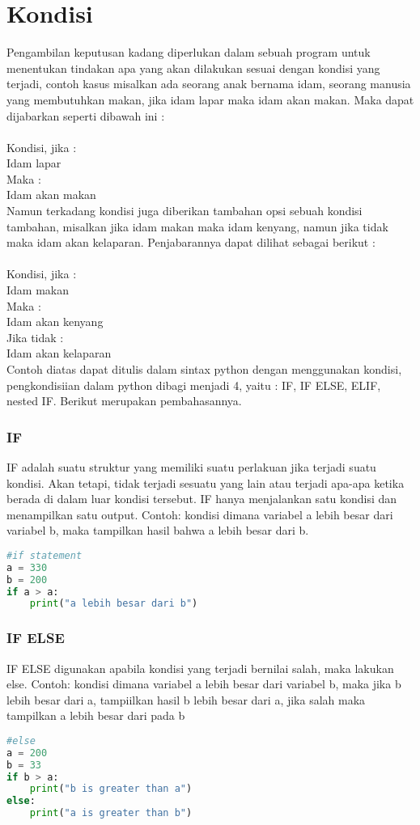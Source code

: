 \section{Kondisi}
Pengambilan keputusan kadang diperlukan dalam sebuah program untuk menentukan tindakan apa yang akan dilakukan sesuai dengan kondisi yang terjadi, contoh kasus misalkan ada seorang anak bernama idam, seorang manusia yang membutuhkan makan, jika idam lapar maka idam akan makan. Maka dapat dijabarkan seperti dibawah ini :\\
\\
Kondisi, jika : \\
Idam lapar \\
Maka : \\
Idam akan makan\\
Namun terkadang kondisi juga diberikan tambahan opsi sebuah kondisi tambahan, misalkan jika idam makan maka idam kenyang, namun jika tidak maka idam akan kelaparan. Penjabarannya dapat dilihat sebagai berikut :\\
\\
Kondisi, jika :\\
 Idam makan \\
 Maka : \\
 Idam akan kenyang \\
 Jika tidak : \\
 Idam akan kelaparan\\
Contoh diatas dapat ditulis dalam sintax python dengan menggunakan kondisi, pengkondisiian dalam python dibagi menjadi 4, yaitu : IF, IF ELSE, ELIF, nested IF. Berikut merupakan pembahasannya.

\subsubsection{IF}
 IF  adalah suatu struktur yang memiliki suatu perlakuan jika terjadi suatu kondisi. Akan tetapi, tidak terjadi sesuatu yang lain atau terjadi apa-apa ketika berada di dalam luar kondisi tersebut. IF hanya menjalankan satu kondisi dan menampilkan satu output. Contoh: kondisi dimana variabel a lebih besar dari variabel b, maka tampilkan hasil bahwa a lebih besar dari b.
\begin{lstlisting}[language=Python]
#if statement 
a = 330 
b = 200 
if a > a: 
	print("a lebih besar dari b")
\end{lstlisting}

\subsubsection{IF ELSE}
IF ELSE digunakan apabila kondisi yang terjadi bernilai salah, maka lakukan else. Contoh: kondisi dimana variabel a lebih besar dari variabel b, maka jika b lebih besar dari a, tampiilkan hasil b lebih besar dari a, jika salah maka tampilkan a lebih besar dari pada b
\begin{lstlisting}[language=Python]
 #else 
a = 200 
b = 33 
if b > a: 
	print("b is greater than a") 
else: 
	print("a is greater than b")
\end{lstlisting}

